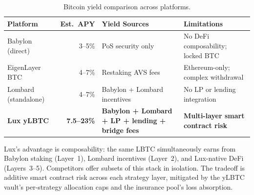 \begin{table}[H]
\centering
\caption{Bitcoin yield comparison across platforms.}
\label{tab:btc_yield_comparison}
\begin{tabular}{p{2.8cm}rp{3.2cm}p{4cm}}
\toprule
\textbf{Platform} & \textbf{Est.\ APY} & \textbf{Yield Sources} & \textbf{Limitations} \\
\midrule
Babylon (direct) & 3--5\% & PoS security only & No DeFi composability; locked BTC \\
EigenLayer BTC & 4--7\% & Restaking AVS fees & Ethereum-only; complex withdrawal \\
Lombard (standalone) & 4--7\% & Babylon + Lombard incentives & No LP or lending integration \\
\textbf{Lux yLBTC} & \textbf{7.5--23\%} & \textbf{Babylon + Lombard + LP + lending + bridge fees} & \textbf{Multi-layer smart contract risk} \\
\bottomrule
\end{tabular}
\end{table}

Lux's advantage is composability: the same LBTC simultaneously earns from Babylon staking (Layer~1), Lombard incentives (Layer~2), and Lux-native DeFi (Layers~3--5). Competitors offer subsets of this stack in isolation. The tradeoff is additive smart contract risk across each strategy layer, mitigated by the yLBTC vault's per-strategy allocation caps and the insurance pool's loss absorption.

